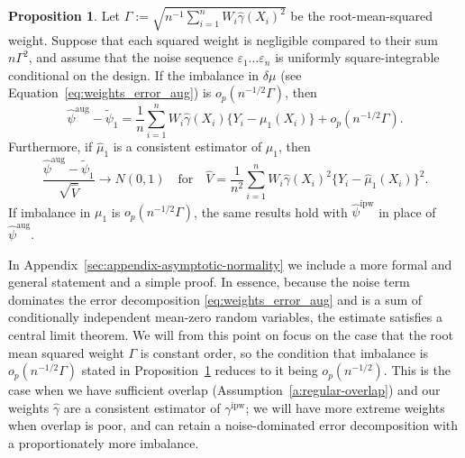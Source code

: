 \documentclass{article}
\DeclarePairedDelimiter\set{\{}{\}}
\theoremstyle{definition}
\newtheorem{proposition}[theorem]{Proposition}
\newcommand{\ipw}{\text{ipw}}
\newcommand{\dm}{\delta \mu}
\newcommand{\hgamma}{\ensuremath{\hat\gamma}}
\newcommand{\gammaipw}{\ensuremath{\gamma^{\ipw}}}
\newcommand{\aug}{\text{aug}}
\newcommand{\<}{\langle}
\renewcommand{\>}{\rangle}
\newcommand\cmnt[2]{\;
{\textcolor{red}{[{\em #1 --- #2}] \;}
}}
\newcommand\avi[1]{\cmnt{#1}{Avi}}
\newcommand\dah[1]{\cmnt{#1}{Skip}}
\begin{document}
\begin{proposition}
 \label{proposition:clt}
 Let $\Gamma :=  \sqrt{n^{-1}\sum_{i=1}^n W_i \hgamma(X_i)^2}$ be the root-mean-squared weight. Suppose that each squared weight is negligible compared to their sum $n\Gamma^2$, and assume that the noise sequence $\varepsilon_1 \ldots \varepsilon_n$ is uniformly square-integrable conditional on the design. If the imbalance in $\dm$
(see Equation~\ref{eq:weights_error_aug}) is $o_p(n^{-1/2} \Gamma)$, then
 \begin{equation}
 \label{eq:asymptotic-linearity}
 \hat\psi^{\aug} -  \tilde \psi_1 = \frac{1}{n}\sum_{i=1}^n W_i \hgamma(X_i) \{ Y_i - \mu_1(X_i) \} + o_p(n^{-1/2}\Gamma).
 \end{equation}
 Furthermore, if $\hat \mu_1$ is a consistent estimator of $\mu_1$, then
 \begin{equation}
 \label{eq:asymptotic-normality}
  \frac{\hat\psi^{\aug} -  \tilde \psi_1}{\sqrt{\hat V}} \to N(0,1) \quad \text{for} \quad
 \hat V = \frac{1}{n^2}\sum_{i=1}^n W_i \hgamma(X_i)^2 \{Y_i - \hat \mu_1(X_i)\}^2.
 \end{equation}
If imbalance in $\mu_1$ is $o_p(n^{-1/2} \Gamma)$, the same results hold with $\hat \psi^{\text{ipw}}$ in place of $\hat\psi^{\text{aug}}$.
\end{proposition}
\noindent In Appendix~\ref{sec:appendix-asymptotic-normality} we include a more formal and general statement and a simple proof.
In essence, because the noise term dominates the error decomposition \eqref{eq:weights_error_aug} and is
a sum of conditionally independent mean-zero random variables, the estimate satisfies a central limit theorem.%
We will from this point on focus on the case that the root mean squared weight $\Gamma$ is constant order, so the condition that imbalance is $o_p(n^{-1/2} \Gamma)$ stated in Proposition~\ref{proposition:clt} reduces to it being $o_p(n^{-1/2})$. This is the case when we have sufficient overlap (Assumption~\ref{a:regular-overlap}) and our weights $\hgamma$ are a consistent estimator of $\gammaipw$; we will have more extreme weights when overlap is poor, and can retain a noise-dominated error decomposition with a proportionately more imbalance.
\end{document}
